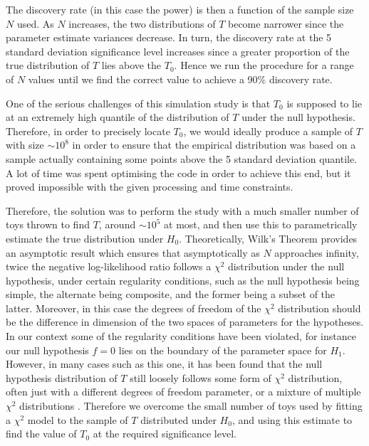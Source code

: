\documentclass[12pt]{article}
\begin{document}
The discovery rate (in this case the power) is then a function of the sample size $N$ used.
As $N$ increases, the two distributions of $T$ become narrower since the parameter estimate variances decrease.
In turn, the discovery rate at the 5 standard deviation significance level increases since a greater proportion of the true distribution of $T$ lies above the $T_0$.
Hence we run the procedure for a range of $N$ values until we find the correct value to achieve a 90\% discovery rate.

One of the serious challenges of this simulation study is that $T_0$ is supposed to lie at an extremely high quantile of the distribution of $T$ under the null hypothesis.
Therefore, in order to precisely locate $T_0$, we would ideally produce a sample of $T$ with size $\sim10^8$ in order to ensure that the empirical distribution was based on a sample actually containing some points above the 5 standard deviation quantile.
A lot of time was spent optimising the code in order to achieve this end, but it proved impossible with the given processing and time constraints.

Therefore, the solution was to perform the study with a much smaller number of toys thrown to find $T$, around $\sim10^5$ at most, and then use this to parametrically estimate the true distribution under $H_0$.
Theoretically, Wilk's Theorem \cite{wilks} provides an asymptotic result which ensures that asymptotically as $N$ approaches infinity, twice the negative log-likelihood ratio follows a $\chi^2$ distribution under the null hypothesis, under certain regularity conditions, such as the null hypothesis being simple, the alternate being composite, and the former being a subset of the latter.
Moreover, in this case the degrees of freedom of the $\chi^2$ distribution should be the difference in dimension of the two spaces of parameters for the hypotheses.
In our context some of the regularity conditions have been violated, for instance our null hypothesis $f=0$ lies on the boundary of the parameter space for $H_1$.
However, in many cases such as this one, it has been found that the null hypothesis distribution of $T$ still loosely follows some form of $\chi^2$ distribution, often just with a different degrees of freedom parameter, or a mixture of multiple $\chi^2$ distributions \cite{wilks_exc_1} \cite{wilks_exc_2}.
Therefore we overcome the small number of toys used by fitting a $\chi^2$ model to the sample of $T$ distributed under $H_0$, and using this estimate to find the value of $T_0$ at the required significance level.
\end{document}
